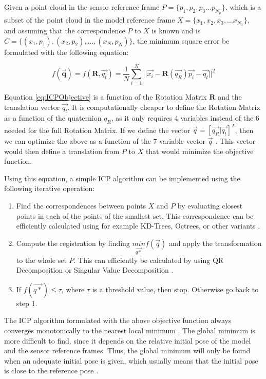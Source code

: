 \documentclass[11pt]{article}
\begin{document}
Given a point cloud in the sensor reference frame $P = \{p_1, p_2, p_3 ... p_{N_p}\}$, which is a subset of the point cloud in the model reference frame $X = \{x_1, x_2, x_3, ... x_{N_x}\}$, and assuming that the correspondence $P$ to $X$ is known and is $C = \{(x_1,p_1), (x_2,p_2), ... , (x_N, p_N)\}$, the minimum square error be formulated with the following equation:
	
\begin{equation}
f(\mathbf{\overrightarrow{q}}) = f(\mathbf{R},\overrightarrow{q_t}) = \frac{1}{N}\sum_{i=1}^{N}{||\overrightarrow{x_i}-\mathbf{R}(\overrightarrow{q_R})\overrightarrow{p_i}-\overrightarrow{q_t}||^{2}} 	
\label{eq:ICPObjective}
\end{equation}		
	
Equation \ref{eq:ICPObjective} is a function of the Rotation Matrix $\mathbf{R}$ and the translation vector $\overrightarrow{q_t}$. It is computationally cheaper to define the Rotation Matrix as a function of the quaternion $q_R$, as it only requires 4 variables instead of the 6 needed for the full Rotation Matrix. If we define the vector $\overrightarrow{q} = [\overrightarrow{q_R} | \overrightarrow{q_t}]^T$, then we can optimize the above as a function of the 7 variable vector $\overrightarrow{q}$ \cite{AMethodRegistration}. This vector would then define a translation from $P$ to $X$ that would minimize the objective function.
	
Using this equation, a simple ICP algorithm can be implemented using the following iterative operation:

\begin{enumerate}[leftmargin=.8in]
\item Find the correspondences between points $X$ and $P$ by evaluating closest points in each of the points of the smallest set. This correspondence can be efficiently calculated using for example KD-Trees, Octrees, or other variants \cite{KDT}.
\item Compute the registration by finding $\underset{\overrightarrow{q*}}{min}f(\overrightarrow{q})$ and apply the transformation to the whole set $P$. This can efficiently be calculated by using QR Decomposition or Singular Value Decomposition \cite{ICPVariants}.
\item If $f(\overrightarrow{q*}) \leq \tau$, where $\tau$ is a threshold value, then stop. Otherwise go back to step 1.
\end{enumerate}	
	
The ICP algorithm formulated with the above objective function always converges monotonically to the nearest local minimum \cite{AMethodRegistration}. The global minimum is more difficult to find, since it depends on the relative initial pose of the model and the sensor reference frames. Thus, the global minimum will only be found when an adequate initial pose is given, which usually means that the initial pose is close to the reference pose \cite{AMethodRegistration}.
\end{document}
